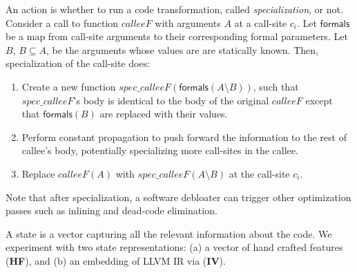 An action is whether to run a code transformation, called
\emph{specialization}, or not. Consider a call to function $\mathit{calleeF}$
with arguments $A$ at a call-site $c_i$. Let $\mathsf{formals}$ be a map from
call-site arguments to their corresponding formal parameters. Let $B$, $B
\subseteq A$, be the arguments whose values are are statically known. Then,
specialization of the call-site does: 
\begin{enumerate}
\item Create a new function $spec\_calleeF(\mathsf{formals}(A \setminus B))$,
  such that $spec\_calleeF$'s body is identical to the body of the original
  $calleeF$ except that $\mathsf{formals}(B)$ are replaced with their values.
  
\item Perform constant propagation to push forward the information to the
  rest of callee's body, potentially specializing more call-sites in
  the callee.
  
\item Replace $\mathit{calleeF}(A)$ with $spec\_calleeF(A \setminus B)$ at the
  call-site $c_i$.
\end{enumerate}

Note that after specialization, a software debloater
can trigger other optimization passes such as inlining and dead-code
elimination.

A state is a vector capturing
all the relevant information about the code. We experiment with two
state representations: (a)  a vector of hand crafted features (\textbf{\textbf{HF}}),
and (b) an embedding of LLVM IR via \insttovec (\textbf{\textbf{IV}}).

